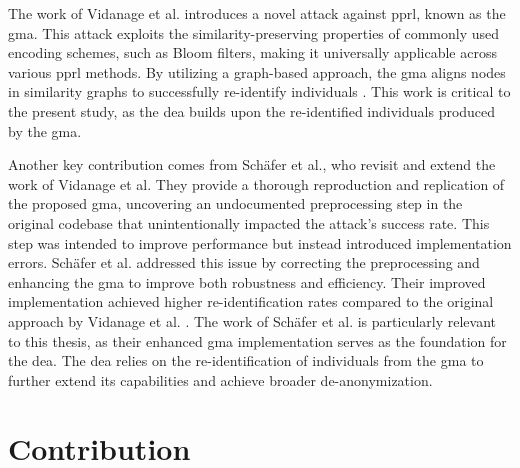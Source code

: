 The work of Vidanage et al. introduces a novel attack against \ac{pprl}, known as the \ac{gma}.
This attack exploits the similarity-preserving properties of commonly used encoding schemes, such as Bloom filters, making it universally applicable across various \ac{pprl} methods.
By utilizing a graph-based approach, the \ac{gma} aligns nodes in similarity graphs to successfully re-identify individuals \cite{vidanage2024}.
This work is critical to the present study, as the \ac{dea} builds upon the re-identified individuals produced by the \ac{gma}.

Another key contribution comes from Schäfer et al., who revisit and extend the work of Vidanage et al.
They provide a thorough reproduction and replication of the proposed \ac{gma}, uncovering an undocumented preprocessing step in the original codebase that unintentionally impacted the attack's success rate.
This step was intended to improve performance but instead introduced implementation errors.
Schäfer et al. addressed this issue by correcting the preprocessing and enhancing the \ac{gma} to improve both robustness and efficiency.
Their improved implementation achieved higher re-identification rates compared to the original approach by Vidanage et al. \cite{schaefer2024}.
The work of Schäfer et al. is particularly relevant to this thesis, as their enhanced \ac{gma} implementation serves as the foundation for the \ac{dea}.
The \ac{dea} relies on the re-identification of individuals from the \ac{gma} to further extend its capabilities and achieve broader de-anonymization.








\section{Contribution}  \label{sec:contribution}

